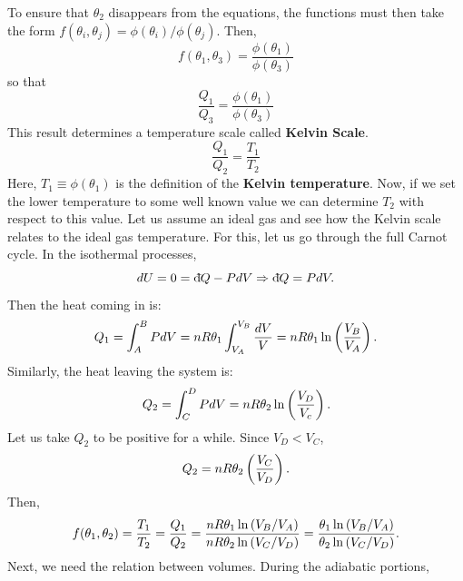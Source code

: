         To ensure that $\theta_2$ disappears from the equations, the functions must then take the form $f(\theta_i,\theta_j)=\phi(\theta_i)/\phi(\theta_j)$. Then,
        \begin{equation}
            f(\theta_1,\theta_3) = \frac{\phi(\theta_1)}{\phi(\theta_3)}
        \end{equation}
        so that 
        \begin{equation}
             \frac{Q_1}{Q_3} = \frac{\phi(\theta_1)}{\phi(\theta_3)}
        \end{equation}
\newpage
        This result determines a temperature scale called \textbf{Kelvin Scale}.
        \begin{equation}
            \frac{Q_1}{Q_2} = \frac{T_1}{T_2}
        \end{equation}
        Here, $T_1 \equiv \phi(\theta_1)$ is the definition of the \textbf{Kelvin temperature}. Now, if we set the lower temperature to some well known value we can determine $T_2$ with respect to this value. Let us assume an ideal gas and see how the Kelvin scale relates to the ideal gas temperature. For this, let us go through the full Carnot cycle. In the isothermal processes,
        \begin{equation}
            dU = 0 = \text{d}\hspace*{-0.13em}\bar{}\hspace*{0.1em} Q - PdV \Rightarrow \text{d}\hspace*{-0.13em}\bar{}\hspace*{0.1em} Q = PdV.
        \end{equation}
        Then the heat coming in is:
        \begin{equation}
            Q_1 = \int_A^B PdV = nR\theta_1\int_{V_A}^{V_B}\frac{dV}{V} = nR\theta_1\ln\left( \frac{V_B}{V_A} \right).
        \end{equation}
        Similarly, the heat leaving the system is:
        \begin{equation}
            Q_2 = \int_C^DPdV = nR\theta_2\ln\left( \frac{V_D}{V_c} \right).
        \end{equation}
        Let us take $Q_2$ to be positive for a while. Since $V_D<V_C$, 
        \begin{equation}
            Q_2 = nR\theta_2\left( \frac{V_C}{V_D} \right).
        \end{equation}
        Then,
        \begin{equation}
            f(\theta_1,\theta_2) =\frac{T_1}{T_2} = \frac{Q_1}{Q_2} = \frac{nR\theta_1\ln\left( V_B/V_A \right)}{nR\theta_2\ln\left( V_C/V_D \right)} = \frac{\theta_1\ln\left( V_B/V_A \right)}{\theta_2\ln\left( V_C/V_D \right)}.
            \label{eq:kelvinfunc}
        \end{equation}
        Next, we need the relation between volumes. During the adiabatic portions, 
